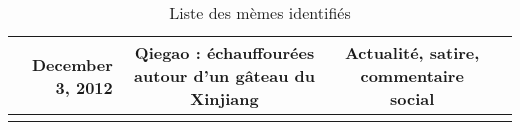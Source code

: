 \begin{table}[ht!]
\begin{minipage}{22cm}
\begin{turn}{90}
\begin{tabulary}{\linewidth}{ r| C C C}
        December 3, 2012  &
        Qiegao : échauffourées autour d'un gâteau du Xinjiang &
        Actualité, satire, commentaire social &
        \\[5ex]
        \hline \\

    \end{tabulary}
        \end{turn}
    \end{minipage}
    \caption[Liste des mèmes identifiés]{Liste des mèmes identifiés}
    \label{fig:memelist}
\end{table}

